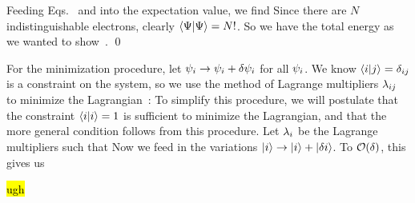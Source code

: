 \documentclass[11pt]{article}
\begin{document}
{	Feeding Eqs.~ and  into the expectation value, we find
	Since there are $N$ indistinguishable electrons, clearly $\braket{\Psi} = N!$.  So we have the total energy
	as we wanted to show~\cite{Kim}. \qed
	
	For the minimization procedure, let $\psi_i \to \psi_i + \delta\psi_i$ for all $\psi_i$.  We know $\braket{i}{j} = \delta_{i j}$ is a constraint on the system, so we use the method of Lagrange multipliers $\lambda_{i j}$ to minimize the Lagrangian~\cite{Lagrange}:
	To simplify this procedure, we will postulate that the constraint $\braket{i} = 1$ is sufficient to minimize the Lagrangian, and that the more general condition follows from this procedure.  Let $\lambda_i$ be the Lagrange multipliers such that
	Now we feed in the variations $\ket{i} \to \ket{i} + \ket{\delta i}$.  To $\order{\del}$, this gives us
	
	\hl{ugh}
}






\end{document}
